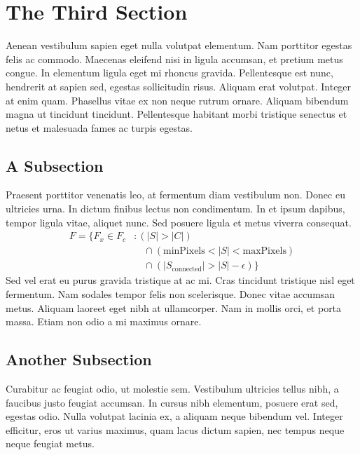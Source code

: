\documentclass[sigconf]{acmart}
\begin{document}
\section{The Third Section}

Aenean vestibulum sapien eget nulla volutpat elementum. Nam porttitor egestas felis ac commodo. Maecenas eleifend nisi in ligula accumsan, et pretium metus congue. In elementum ligula eget mi rhoncus gravida. Pellentesque est nunc, hendrerit at sapien sed, egestas sollicitudin risus. Aliquam erat volutpat. Integer at enim quam. Phasellus vitae ex non neque rutrum ornare. Aliquam bibendum magna ut tincidunt tincidunt. Pellentesque habitant morbi tristique senectus et netus et malesuada fames ac turpis egestas.

\subsection{A Subsection}

Praesent porttitor venenatis leo, at fermentum diam vestibulum non. Donec eu ultricies urna. In dictum finibus lectus non condimentum. In et ipsum dapibus, tempor ligula vitae, aliquet nunc. Sed posuere ligula et metus viverra consequat. 
\begin{equation}
\begin{split}
F = \{F_{x} \in  F_{c} &: (|S| > |C|) \\
 &\quad \cap (\text{minPixels}  < |S| < \text{maxPixels}) \\
 &\quad \cap (|S_{\text{connected}}| > |S| - \epsilon) \}
\end{split}
\end{equation}
Sed vel erat eu purus gravida tristique at ac mi. Cras tincidunt tristique nisl eget fermentum. Nam sodales tempor felis non scelerisque. Donec vitae accumsan metus. Aliquam laoreet eget nibh at ullamcorper. Nam in mollis orci, et porta massa. Etiam non odio a mi maximus ornare.

\subsection{Another Subsection}

Curabitur ac feugiat odio, ut molestie sem. Vestibulum ultricies tellus nibh, a faucibus justo feugiat accumsan. In cursus nibh elementum, posuere erat sed, egestas odio. Nulla volutpat lacinia ex, a aliquam neque bibendum vel. Integer efficitur, eros ut varius maximus, quam lacus dictum sapien, nec tempus neque neque feugiat metus. 
\end{document}
